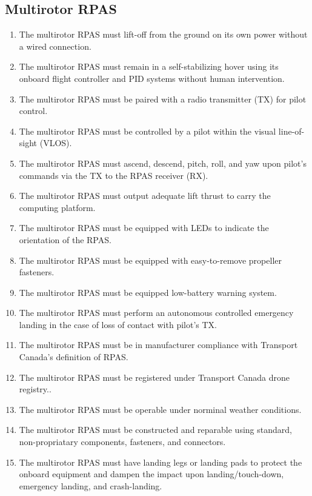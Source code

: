 \documentclass[10pt,letterpaper]{article}
\begin{document}
\subsection{Multirotor RPAS}
\begin{enumerate}[label=F.DR.\arabic*, wide=1cm, widest=3cm, leftmargin=*, font=\bfseries, noitemsep,topsep=0pt, parsep=4pt, partopsep=0pt]
	\item The multirotor RPAS must lift-off from the ground on its own power without a wired connection.
	\item The multirotor RPAS must remain in a self-stabilizing hover using its onboard flight controller and PID systems without human intervention.
	\item The multirotor RPAS must be paired with a radio transmitter (TX) for pilot control.
	\item The multirotor RPAS must be controlled by a pilot within the visual line-of-sight (VLOS).
	\item The multirotor RPAS must ascend, descend, pitch, roll, and yaw upon pilot's commands via the TX to the RPAS receiver (RX).
	\item The multirotor RPAS must output adequate lift thrust to carry the computing platform.
	\item The multirotor RPAS must be equipped with LEDs to indicate the orientation of the RPAS.
	\item The multirotor RPAS must be equipped with easy-to-remove propeller fasteners.
	\item The multirotor RPAS must be equipped low-battery warning system.
	\item The multirotor RPAS must perform an autonomous controlled emergency landing in the case of loss of contact with pilot's TX.
	\item The multirotor RPAS must be in manufacturer compliance with Transport Canada's definition of RPAS\cite{tp15263}.
	\item The multirotor RPAS must be registered under Transport Canada drone registry.\cite{tcdronereg}.
	\item The multirotor RPAS must be operable under norminal weather conditions.
	\item The multirotor RPAS must be constructed and reparable using standard, non-propriatary components, fasteners, and connectors.
	\item The multirotor RPAS must have landing legs or landing pads to protect the onboard equipment and dampen the impact upon landing/touch-down, emergency landing, and crash-landing.
\end{enumerate}
\end{document}
